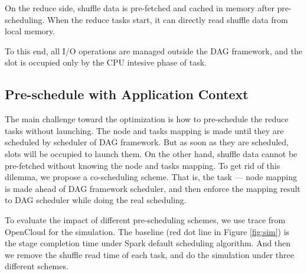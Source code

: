 On the reduce side, shuffle data is pre-fetched and cached in memory after pre-scheduling. When the reduce tasks start, it can directly read shuffle data from local memory.

To this end, all I/O operations are managed outside the DAG framework, and the slot is occupied only by the CPU intesive phase of task.

\subsection{Pre-schedule with Application Context}
The main challenge toward the optimization is how to pre-schedule the reduce tasks without launching. The node and tasks mapping is made until they are scheduled by scheduler of DAG framework. But as soon as they are scheduled, slots will be occupied to launch them.  On the other hand, shuffle data cannot be pre-fetched without knowing the node and tasks mapping. 
To get rid of this dilemma, we propose a co-scheduling scheme. That is, the task --- node mapping is made ahead of DAG framework scheduler, and then enforce the mapping result to DAG scheduler while doing the real scheduling. 

To evaluate the impact of different pre-scheduling schemes, we use trace from OpenCloud \cite{opencloudtrace} for the simulation. The baseline (red dot line in Figure \ref{fig:sim}) is the stage completion time under Spark default scheduling algorithm. And then we remove the shuffle read time of each task, and do the simulation under three different schemes.

